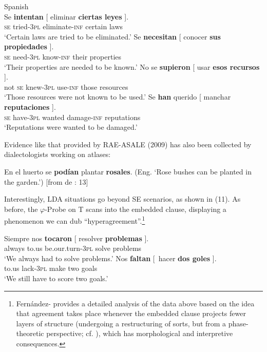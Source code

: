 \documentclass[output=paper]{langsci/langscibook}
\begin{document}
\ea%
    Spanish\label{ex:key:9}\\
    \ea
    \gll Se  \textbf{intentan}  [ eliminar        \textbf{ciertas  leyes} ].        \\
         \textsc{se} tried\textsc{{}-3pl}  eliminate-\textsc{inf}  certain   laws\\
    \glt ‘Certain laws are tried to be eliminated.’  
    \ex
    \gll Se  \textbf{necesitan}  [ conocer     \textbf{sus    propiedades} ].         \\
            \textsc{se}  need\textsc{{}-3pl}   know-\textsc{inf}   their  properties\\
    \glt    ‘Their properties are needed to be known.’
    \ex
    \gll No se   \textbf{supieron}  [ usar        \textbf{esos    recursos} ].        \\
            not \textsc{se} knew\textsc{{}-3pl}    use-\textsc{inf}   those   resources\\
    \glt    ‘Those resources were not known to be used.’
    \ex
    \gll  Se   \textbf{han}           querido [ manchar        \textbf{reputaciones} ].     \\
            \textsc{se} have\textsc{{}-3pl}  wanted    damage-\textsc{inf}   reputations\\
    \glt     ‘Reputations were wanted to be damaged.’
    \z
\z

Evidence like that provided by RAE-ASALE (2009) has also been collected by dialectologists working on atlases:

\ea%
En el huerto se \textbf{podían} plantar \textbf{rosales}.  (Eng. ‘Rose bushes can be planted in the garden.’) [from de \citealt{Benito2010}: 13] \\
\z

Interestingly, LDA situations go beyond SE scenarios, as shown in (11). As before, the $\varphi $-Probe on T scans into the embedded clause, displaying a phenomenon we can dub “hyperagreement”.\footnote{Fernández-\citet{Serrano2016} provides a detailed analysis of the data above based on the idea that agreement takes place whenever the embedded clause projects fewer layers of structure (undergoing a restructuring of sorts, but from a phase-theoretic perspective; cf. \citealt{Gallego2009}), which has morphological and interpretive consequences.} 

\ea%
    \label{ex:key:11}
    \ea
    \gll Siempre   nos    \textbf{tocaron}              [ resolver  \textbf{problemas} ].\\
         always    to.us  be.our.turn-\textsc{3pl}  solve       problems\\
    \glt ‘We always had to solve problems.’
    \ex
    \gll Nos   \textbf{faltan}    [~hacer  \textbf{dos  goles} ].\\
         to.us  lack-\textsc{3pl}   make two goals\\
    \glt ‘We still have to score two goals.’
    \z
\z    
\end{document}
